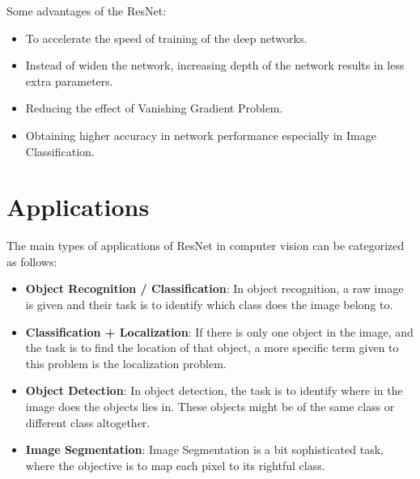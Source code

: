 \documentclass[12pt]{article}
\numberwithin{equation}{section}
\numberwithin{table}{section}
\numberwithin{figure}{section}
\begin{document}

Some advantages of the ResNet:

\begin{itemize}
	\item To accelerate the speed of training of the deep networks.
	
	\item Instead of widen the network, increasing depth of the network results in less extra parameters.
	
	\item Reducing the effect of Vanishing Gradient Problem.
	
	\item Obtaining higher accuracy in network performance especially in Image Classification.
\end{itemize}



\section{Applications} \label{applications}

The main types of applications of ResNet in computer vision can be categorized as follows:

\begin{itemize}
	\item \textbf{Object Recognition / Classification}: In object recognition, a raw image is given and their task is to identify which class does the image belong to.
	\item \textbf{Classification + Localization}:  If there is only one object in the image, and the task is to find the location of that object, a more specific term given to this problem is the localization problem.
	\item \textbf{Object Detection}: In object detection, the task is to identify where in the image does the objects lies in. These objects might be of the same class or different class altogether.
	\item \textbf{Image Segmentation}: Image Segmentation is a bit sophisticated task, where the objective is to map each pixel to its rightful class.
\end{itemize}





\end{document}
